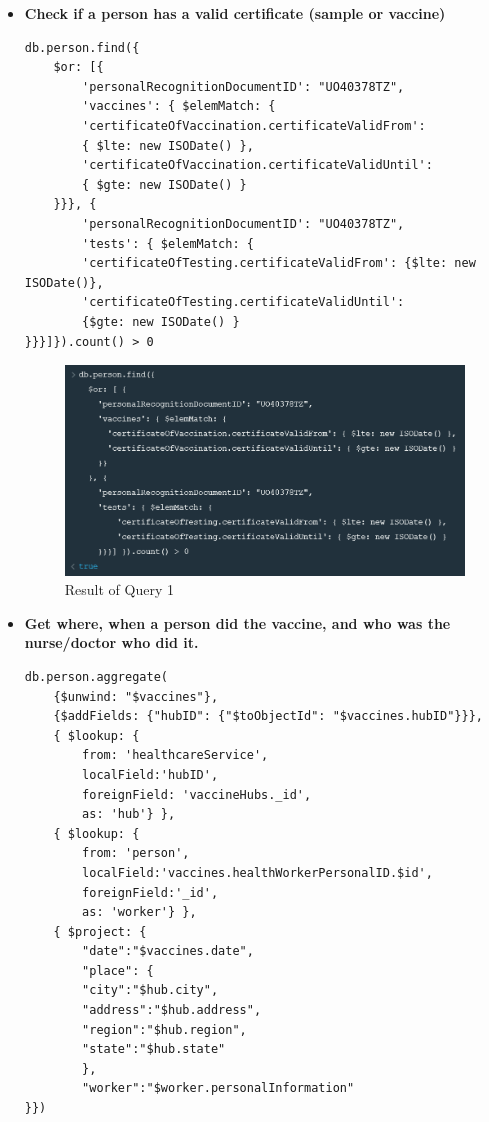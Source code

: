 \documentclass{article}[IEEEtran]
\begin{document}
\begin{itemize}

\item\textbf{Check if a person has a valid certificate (sample or vaccine)}
\begin{lstlisting}
db.person.find({
    $or: [{
        'personalRecognitionDocumentID': "UO40378TZ",
        'vaccines': { $elemMatch: {
        'certificateOfVaccination.certificateValidFrom':
        { $lte: new ISODate() },
        'certificateOfVaccination.certificateValidUntil': 
        { $gte: new ISODate() }
    }}}, {
        'personalRecognitionDocumentID': "UO40378TZ",
        'tests': { $elemMatch: {
        'certificateOfTesting.certificateValidFrom': {$lte: new ISODate()}, 
        'certificateOfTesting.certificateValidUntil': 
        {$gte: new ISODate() } 
}}}]}).count() > 0
\end{lstlisting}

\begin{figure}[H]
\begin{center}
    \includegraphics[width=\textwidth, frame]{Query1.PNG}
    \caption{Result of Query 1}
\end{center}
\end{figure}

\newpage 

\item \textbf{Get where, when a person did the vaccine, and who was the nurse/doctor who did it.}
\begin{lstlisting}
db.person.aggregate( 
    {$unwind: "$vaccines"},
    {$addFields: {"hubID": {"$toObjectId": "$vaccines.hubID"}}},
    { $lookup: {
        from: 'healthcareService',
        localField:'hubID',
        foreignField: 'vaccineHubs._id',
        as: 'hub'} }, 
    { $lookup: {
        from: 'person',
        localField:'vaccines.healthWorkerPersonalID.$id',
        foreignField:'_id',
        as: 'worker'} }, 
    { $project: {
        "date":"$vaccines.date",
        "place": {
        "city":"$hub.city",
        "address":"$hub.address",
        "region":"$hub.region",
        "state":"$hub.state"
        },
        "worker":"$worker.personalInformation"
}})
\end{lstlisting}


\end{itemize}
\end{document}
